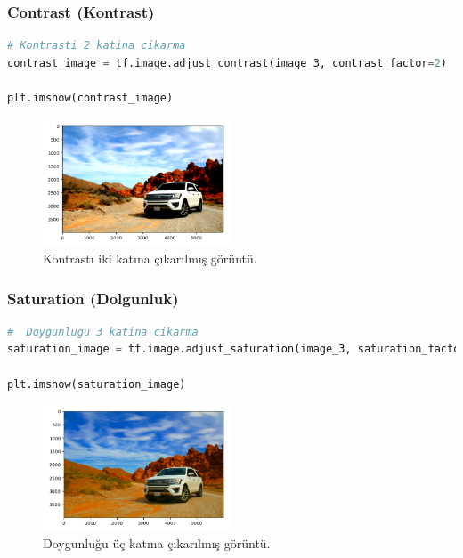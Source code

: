 \subsubsection{Contrast (Kontrast)}

\begin{lstlisting}[language=Python]
# Kontrasti 2 katina cikarma
contrast_image = tf.image.adjust_contrast(image_3, contrast_factor=2)

plt.imshow(contrast_image)
\end{lstlisting}

\begin{figure}[h]
    \centering
    \includegraphics[width=0.5\textwidth]{images/image_aug_07.png}
    \caption{Kontrastı iki katına çıkarılmış görüntü.}
    \label{fig:enter-label}
\end{figure}

\subsubsection{Saturation (Dolgunluk)}

\begin{lstlisting}[language=Python]
#  Doygunlugu 3 katina cikarma
saturation_image = tf.image.adjust_saturation(image_3, saturation_factor=3)

plt.imshow(saturation_image)
\end{lstlisting}

\newpage

\begin{figure}[h]
    \centering
    \includegraphics[width=0.5\textwidth]{images/image_aug_08.png}
    \caption{Doygunluğu üç katına çıkarılmış görüntü.}
    \label{fig:enter-label}
\end{figure}

